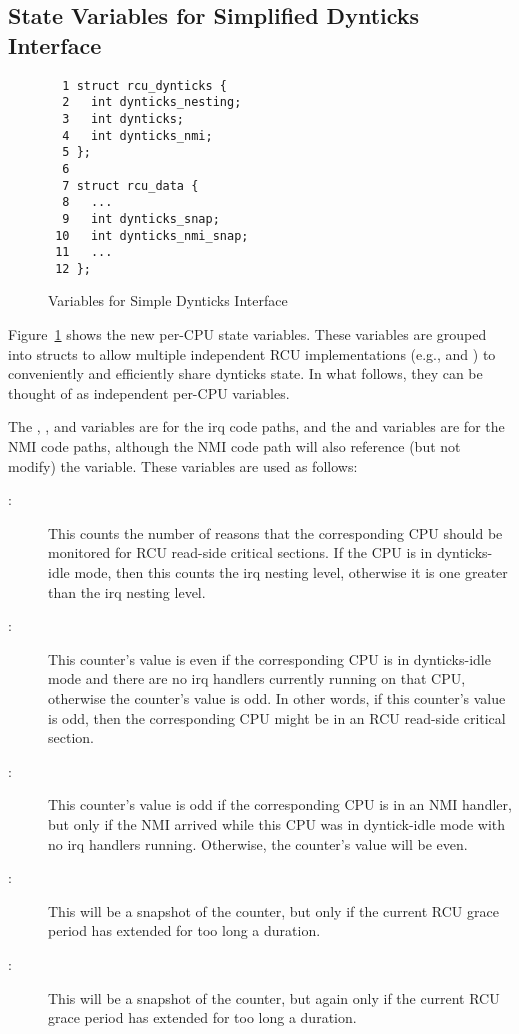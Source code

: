 \subsection{State Variables for Simplified Dynticks Interface}
\label{app:formal:State Variables for Simplified Dynticks Interface}

\begin{figure}[tbp]
{ \scriptsize
\begin{verbatim}
  1 struct rcu_dynticks {
  2   int dynticks_nesting;
  3   int dynticks;
  4   int dynticks_nmi;
  5 };
  6
  7 struct rcu_data {
  8   ...
  9   int dynticks_snap;
 10   int dynticks_nmi_snap;
 11   ...
 12 };
\end{verbatim}
}
\caption{Variables for Simple Dynticks Interface}
\label{fig:app:formal:Variables for Simple Dynticks Interface}
\end{figure}

Figure~\ref{fig:app:formal:Variables for Simple Dynticks Interface}
shows the new per-CPU state variables.
These variables are grouped into structs to allow multiple independent
RCU implementations (e.g.,  and ) to conveniently
and efficiently share dynticks state.
In what follows, they can be thought of as independent per-CPU variables.

The , , and  variables
are for the irq code paths, and the  and
 variables are for the NMI code paths, although
the NMI code path will also reference (but not modify) the
 variable.
These variables are used as follows:

\begin{description}
\item[:]
	This counts the number of reasons that the corresponding
	CPU should be monitored for RCU read-side critical sections.
	If the CPU is in dynticks-idle mode, then this counts the
	irq nesting level, otherwise it is one greater than the
	irq nesting level.
\item[:]
	This counter's value is even if the corresponding CPU is
	in dynticks-idle mode and there are no irq handlers currently
	running on that CPU, otherwise the counter's value is odd.
	In other words, if this counter's value is odd, then the
	corresponding CPU might be in an RCU read-side critical section.
\item[:]
	This counter's value is odd if the corresponding CPU is
	in an NMI handler, but only if the NMI arrived while this
	CPU was in dyntick-idle mode with no irq handlers running.
	Otherwise, the counter's value will be even.
\item[:]
	This will be a snapshot of the  counter, but
	only if the current RCU grace period has extended for too
	long a duration.
\item[:]
	This will be a snapshot of the  counter, but
	again only if the current RCU grace period has extended for too
	long a duration.
\end{description}

